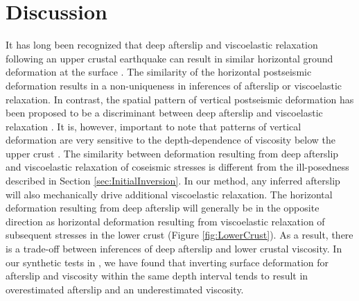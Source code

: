 \documentclass[draft,linenumbers]{AGUJournal}
\begin{document}
\section{Discussion}\label{Discussion}

It has long been recognized that deep afterslip and viscoelastic relaxation following an upper crustal earthquake can result in similar horizontal ground deformation at the surface \citep[e.g.][]{Savage1990, Pollitz2001, Hearn2003, Feigl2006}. The similarity of the horizontal postseismic deformation results in a non-uniqueness in inferences of afterslip or viscoelastic relaxation. In contrast, the spatial pattern of vertical postseismic deformation has been proposed to be a discriminant between deep afterslip and viscoelastic relaxation \citep[e.g.][]{Pollitz2001, Hearn2003}. It is, however, important to note that patterns of vertical deformation are very sensitive to the depth-dependence of viscosity below the upper crust \citep{Yang1981,Hetland2014}.  The similarity between deformation resulting from deep afterslip and viscoelastic relaxation of coseismic stresses is different from the ill-posedness described in Section \ref{sec:InitialInversion}. In our method, any inferred afterslip will also mechanically drive additional viscoelastic relaxation.  The horizontal deformation resulting from deep afterslip will generally be in the opposite direction as horizontal deformation resulting from viscoelastic relaxation of subsequent stresses in the lower crust (Figure \ref{fig:LowerCrust}).  As a result, there is a trade-off between inferences of deep afterslip and lower crustal viscosity.  In our synthetic tests in \citet{Hines2016}, we have found that inverting surface deformation for afterslip and viscosity within the same depth interval tends to result in overestimated afterslip and an underestimated viscosity.
\end{document}
